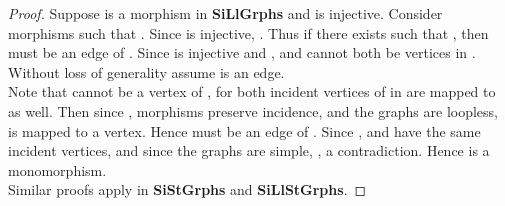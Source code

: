 \documentclass[11pt]{article}
\begin{document}
\begin{proof}
\indent Suppose  is a morphism in \textbf{SiLlGrphs} and  is injective. Consider morphisms  such that . Since  is injective, . Thus if there exists  such that , then  must be an edge of . Since  is injective and ,  and  cannot both be vertices in . Without loss of generality assume  is an edge.\\
\indent Note that  cannot be a vertex of , for both incident vertices of  in  are mapped to  as well. Then since , morphisms preserve incidence, and the graphs are loopless,  is mapped to a vertex. Hence  must be an edge of . Since ,  and  have the same incident vertices, and since the graphs are simple, , a contradiction. Hence  is a monomorphism.\\
\indent Similar proofs apply in \textbf{SiStGrphs} and \textbf{SiLlStGrphs}. 
\end{proof}
\end{document}

